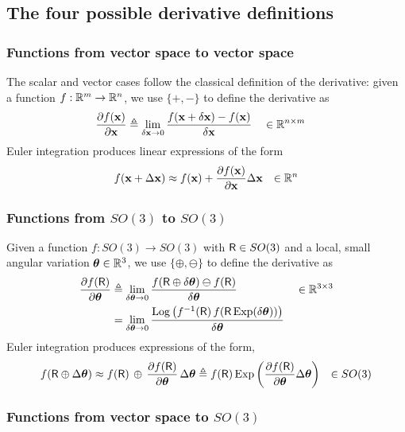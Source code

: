 \subsection{The four possible derivative definitions}



\subsubsection{Functions from vector space to vector space}

The scalar and vector cases follow the classical definition of the derivative: given a function $f:{\mathbb R}^m\to{\mathbb R}^n$, we use $\{+,-\}$ to define the derivative as
%
\begin{align}
\frac{\partial f({\bf x})}{\partial{\bf x}} &\triangleq \lim_{\delta{\bf x}\to0}\frac{f({\bf x}+\delta{\bf x})-f({\bf x})}{\delta{\bf x}} &&\in {\mathbb R}^{n\times m} \label{equ:derivative_vector}
\end{align}
%
Euler integration produces linear expressions of the form
%
\begin{align*}
f({\bf x}+\Delta{\bf x}) &\approx f({\bf x}) + \frac{\partial f({\bf x})}{\partial{\bf x}}\Delta{\bf x}
& \in {\mathbb R}^n
\end{align*}

\subsubsection{Functions from $SO(3)$ to $SO(3)$}

Given a function $f:SO(3) \to SO(3)$ with $\mathsf R\in SO(3)$ and a local, small angular variation ${{\bm \theta}}\in{\mathbb R}^3$, we use $\{\oplus,\ominus\}$ to define the derivative as
%
\begin{align}
\frac{\partial f(\mathsf R)}{\partial{{\bm \theta}}} 
&\triangleq \lim_{\delta{{\bm \theta}}\to0}\frac{f(\mathsf R\oplus\delta{{\bm \theta}})\ominus f(\mathsf R)}{\delta{{\bm \theta}}}  && \in {\mathbb R}^{3\times 3}\\
&= \lim_{\delta{{\bm \theta}}\to0}\frac{\operatorname*{Log}\big(f^{-1}(\mathsf R)\,f(\mathsf R\operatorname*{Exp}(\delta{{\bm \theta}}))\big)}{\delta{{\bm \theta}}} \label{equ:derivative_SO3}
\end{align}
%
Euler integration produces expressions of the form,
%
\begin{align*}
f(\mathsf R\oplus\Delta{{\bm \theta}}) &\approx f(\mathsf R)\,\oplus\,\frac{\partial f(\mathsf R)}{\partial{{\bm \theta}}}\,\Delta{{\bm \theta}}
 \triangleq f(\mathsf R)\operatorname*{Exp}\left(\frac{\partial f(\mathsf R)}{\partial{{\bm \theta}}}\Delta{{\bm \theta}}\right)
 & \in SO(3)
\end{align*}




\subsubsection{Functions from vector space to $SO(3)$}

